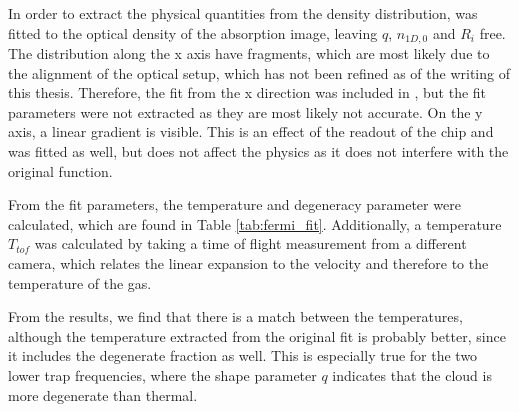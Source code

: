 In order to extract the physical quantities from the density distribution,  was fitted to the optical density of the absorption image, leaving $q$, $n_{1D,0}$ and $R_i$ free. The distribution along the x axis have fragments, which are most likely due to the alignment of the optical setup, which has not been refined as of the writing of this thesis. Therefore, the fit from the x direction was included in , but the fit parameters were not extracted as they are most likely not accurate. On the y axis, a linear gradient is visible. This is an effect of the readout of the chip and was fitted as well, but does not affect the physics as it does not interfere with the original function.

From the fit parameters, the temperature and degeneracy parameter were calculated, which are found in Table \ref{tab:fermi_fit}. Additionally, a temperature $T_{tof}$ was calculated by taking a time of flight measurement from a different camera, which relates the linear expansion to the velocity and therefore to the temperature of the gas.

From the results, we find that there is a match between the temperatures, although the temperature extracted from the original fit is probably better, since it includes the degenerate fraction as well. This is especially true for the two lower trap frequencies, where the shape parameter $q$ indicates that the cloud is more degenerate than thermal.

